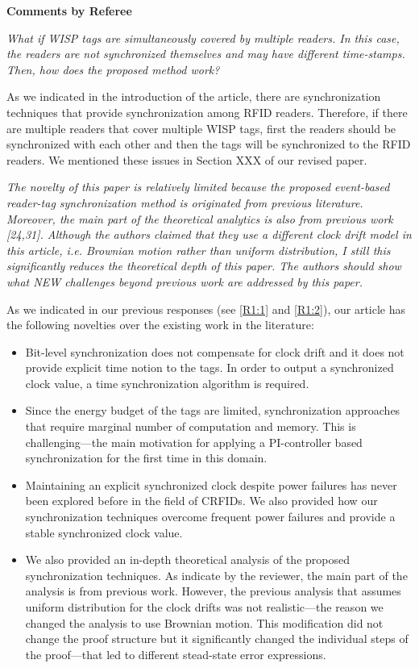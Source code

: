 \documentclass[10pt]{article}
\newcommand{\referee}[1]{
	{\item \color{OliveGreen} \emph{{#1}}}
	\label{R\therefereeCounter:\arabic{enumi}}
}
\newcommand{\response}[1]{{\color{blue} #1}}
\newcounter{refereeCounter}
\newenvironment{responses}{%
\refstepcounter{refereeCounter}%
\textbf{\large Comments by Referee \therefereeCounter}
\begin{enumerate}%
\renewcommand{\labelenumi}{\textbf{[R\therefereeCounter :\,\arabic{enumi}]}} %
}{\end{enumerate}}
\begin{document}
\begin{responses}
\referee{What if WISP tags are simultaneously covered by multiple readers. In this case, the readers are not synchronized themselves and may have different time-stamps. Then, how does the proposed method work?}

\response{
As we indicated in the introduction of the article, there are synchronization techniques that provide synchronization among RFID readers. Therefore, if there are multiple readers that cover multiple WISP tags, first the readers should be synchronized with each other and then the tags will be synchronized to the RFID readers. We mentioned these issues in {\color{red} Section XXX} of our revised paper.
}

\referee{The novelty of this paper is relatively limited because the proposed event-based reader-tag synchronization method is originated from previous literature. Moreover, the main part of the theoretical analytics is also from previous work [24,31]. Although the authors claimed that they use a different clock drift model in this article, i.e. Brownian motion rather than uniform distribution, I still this significantly reduces the theoretical depth of this paper. The authors should show what NEW challenges beyond previous work are addressed by this paper. }

\response{
As we indicated in our previous responses (see \hyperref[R1:1]{[R1:1]} and \hyperref[R1:2]{[R1:2]}), our article has the following novelties over the existing work in the literature:
\begin{itemize}
	\item Bit-level synchronization does not compensate for clock drift and it does not provide explicit time notion to the tags. In order to output a synchronized clock value, a time synchronization algorithm is required.
	\item Since the energy budget of the tags are limited, synchronization approaches that require marginal number of computation and memory. This is challenging---the main motivation for applying a PI-controller based synchronization for the first time in this domain.
	\item Maintaining an explicit synchronized clock despite power failures has never been explored before in the field of CRFIDs. We also provided how our synchronization techniques overcome frequent power failures and provide a stable synchronized clock value.
	\item  We also provided an in-depth theoretical analysis of the proposed synchronization techniques. As indicate by the reviewer, the main part of the analysis is from previous work. However, the previous analysis that assumes uniform distribution for the clock drifts was not realistic---the reason we changed the analysis to use Brownian motion. This modification did not change the proof structure but it significantly changed the individual steps of the proof---that led to different stead-state error expressions.
\end{itemize}
}

\end{responses}
\end{document}
